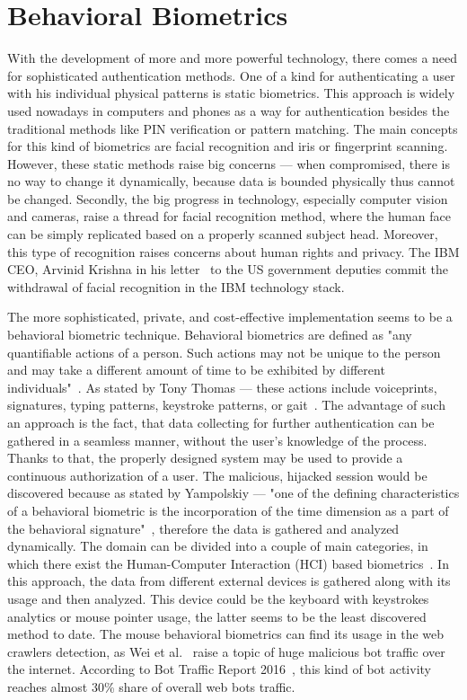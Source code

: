 \section{Behavioral Biometrics}\label{sec:behavioral-biometrics}
With the development of more and more powerful technology, there comes a need for sophisticated authentication methods.
One of a kind for authenticating a user with his individual physical patterns is static biometrics.
This approach is widely used nowadays in computers and phones as a way for authentication besides the traditional methods like PIN verification or pattern matching.
The main concepts for this kind of biometrics are facial recognition and iris or fingerprint scanning.
However, these static methods raise big concerns --- when compromised, there is no way to change it dynamically, because data is bounded physically thus cannot be changed.
Secondly, the big progress in technology, especially computer vision and cameras, raise a thread for facial recognition method, where the human face can be simply replicated based on a properly scanned subject head.
Moreover, this type of recognition raises concerns about human rights and privacy.
The IBM CEO, Arvinid Krishna in his letter~\cite{ibm_2020} to the US government deputies commit the withdrawal of facial recognition in the IBM technology stack.

The more sophisticated, private, and cost-effective implementation seems to be a behavioral biometric technique.
Behavioral biometrics are defined as "any quantifiable actions of a person. Such actions may not be unique to the person and may take a different amount of time to be exhibited by different individuals"~\cite{Yampolskiy2011}.
As stated by Tony Thomas --- these actions include voiceprints, signatures, typing patterns, keystroke patterns, or gait~\cite{thomas2020machine}.
The advantage of such an approach is the fact, that data collecting for further authentication can be gathered in a seamless manner, without the user's knowledge of the process.
Thanks to that, the properly designed system may be used to provide a continuous authorization of a user.
The malicious, hijacked session would be discovered because as stated by Yampolskiy --- "one of the defining characteristics of a behavioral biometric is the incorporation of the time dimension as a part of the behavioral signature"~\cite{Yampolskiy2011}, therefore the data is gathered and analyzed dynamically.
The domain can be divided into a couple of main categories, in which there exist the Human-Computer Interaction (HCI) based biometrics~\cite{Yampolskiy2011}.
In this approach, the data from different external devices is gathered along with its usage and then analyzed.
This device could be the keyboard with keystrokes analytics or mouse pointer usage, the latter seems to be the least discovered method to date.
The mouse behavioral biometrics can find its usage in the web crawlers detection, as Wei et al.~\cite{a-deep-learning-approach-to-web-bot-detection-using-mouse-behavioral-biometrics} raise a topic of huge malicious bot traffic over the internet. 
According to Bot Traffic Report 2016~\cite{bot-share-2016}, this kind of bot activity reaches almost 30\% share of overall web bots traffic.

